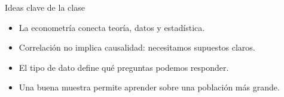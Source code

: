 \documentclass{beamer}
\begin{document}
\begin{frame}{Ideas clave de la clase}
\begin{itemize}
    \item La econometría conecta teoría, datos y estadística.
    \item Correlación no implica causalidad: necesitamos supuestos claros.
    \item El tipo de dato define qué preguntas podemos responder.
    \item Una buena muestra permite aprender sobre una población más grande.
\end{itemize}
\end{frame}
\end{document}
